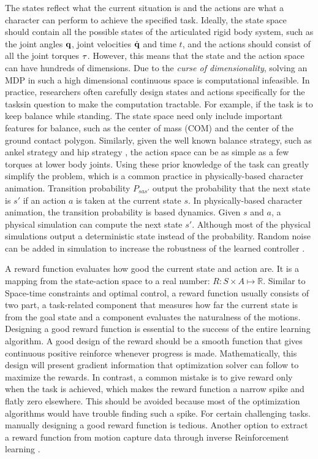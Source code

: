 The states reflect what the current situation is and the actions are what a character can perform to achieve the specified task. Ideally, the state space should contain all the possible states of the articulated rigid body system, such as the joint angles $\mathbf{q}$, joint velocities $\dot{\mathbf{q}}$ and time $t$, and the actions should consist of all the joint torques $\mathbf{\tau}$. However, this means that the state and the action space can have hundreds of dimensions. Due to the \emph{curse of dimensionality}, solving an MDP in such a high dimensional continuous space is computational infeasible. In practice, researchers often carefully design states and actions specifically for the tasksin question to make the computation tractable. For example, if the task is to keep balance while standing. The state space need only include important features for balance, such as the center of mass (COM) and the center of the ground contact polygon. Similarly, given the well known balance strategy, such as ankel strategy \cite{} and hip strategy \cite{}, the action space can be as simple as a few torques at lower body joints. Using these prior knowledge of the task can greatly simplify the problem, which is a common practice in physically-based character animation. Transition probability $P_{sas'}$ output the probability that the next state is $s'$ if an action $a$ is taken at the current state $s$. In physically-based character animation, the transition probability is based dynamics. Given $s$ and $a$, a physical simulation can compute the next state $s'$. Although most of the physical simulations output a deterministic state instead of the probability. Random noise can be added in simulation to increase the robustness of the learned controller \cite{}.

A reward function evaluates how good the current state and action are. It is a mapping from the state-action space to a real number: $R: S\times A\mapsto \mathbb{R}$. Similar to Space-time constraints and optimal control, a reward function usually consists of two part, a task-related component that measures how far the current state is from the goal state and a component evaluates the naturalness of the motions. Designing a good reward function is essential to the success of the entire learning algorithm. A good design of the reward should be a smooth function that gives continuous positive reinforce whenever progress is made. Mathematically, this design will present gradient information that optimization solver can follow to maximize the rewards. In contrast, a common mistake is to give reward only when the task is achieved, which makes the reward function a narrow spike and flatly zero elsewhere. This should be avoided because most of the optimization algorithms would have trouble finding such a spike. For certain challenging tasks. manually designing a good reward function is tedious. Another option to extract a reward function from motion capture data through inverse Reinforcement learning \cite{}.

